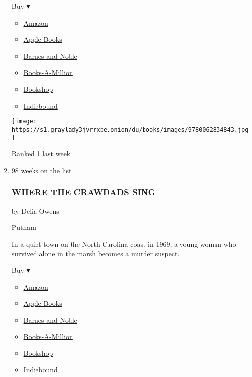 \begin{enumerate}
  Buy ▾

  \begin{itemize}
  \tightlist
  \item
    \href{https://www.amazon.com/dp/0062834843?tag=NYTBSREV-20\&tag=NYTBS-20}{Amazon}
  \item
    \href{https://du-gae-books-dot-nyt-du-prd.appspot.com/buy?title=THE+ORDER\&author=Daniel+Silva}{Apple
    Books}
  \item
    \href{https://www.anrdoezrs.net/click-7990613-11819508?url=https\%3A\%2F\%2Fwww.barnesandnoble.com\%2Fw\%2F\%3Fean\%3D9780062834843}{Barnes
    and Noble}
  \item
    \href{https://www.anrdoezrs.net/click-7990613-35140?url=https\%3A\%2F\%2Fwww.booksamillion.com\%2Fp\%2FTHE\%2BORDER\%2FDaniel\%2BSilva\%2F9780062834843}{Books-A-Million}
  \item
    \href{https://bookshop.org/a/3546/9780062834843}{Bookshop}
  \item
    \href{https://www.indiebound.org/book/9780062834843?aff=NYT}{Indiebound}
  \end{itemize}

  \texttt{[image: https://s1.graylady3jvrrxbe.onion/du/books/images/9780062834843.jpg]}

  Ranked 1 last week
\item
  98 weeks on the list

  \hypertarget{where-the-crawdads-sing}{%
  \subsubsection{WHERE THE CRAWDADS
  SING}\label{where-the-crawdads-sing}}

  by Delia Owens

  Putnam

  In a quiet town on the North Carolina coast in 1969, a young woman who
  survived alone in the marsh becomes a murder suspect.

  Buy ▾

  \begin{itemize}
  \tightlist
  \item
    \href{https://www.amazon.com/Where-Crawdads-Sing-Delia-Owens/dp/0735219095?tag=NYTBS-20}{Amazon}
  \item
    \href{https://du-gae-books-dot-nyt-du-prd.appspot.com/buy?title=WHERE+THE+CRAWDADS+SING\&author=Delia+Owens}{Apple
    Books}
  \item
    \href{https://www.anrdoezrs.net/click-7990613-11819508?url=https\%3A\%2F\%2Fwww.barnesandnoble.com\%2Fw\%2F\%3Fean\%3D9780735219090}{Barnes
    and Noble}
  \item
    \href{https://www.anrdoezrs.net/click-7990613-35140?url=https\%3A\%2F\%2Fwww.booksamillion.com\%2Fp\%2FWHERE\%2BTHE\%2BCRAWDADS\%2BSING\%2FDelia\%2BOwens\%2F9780735219090}{Books-A-Million}
  \item
    \href{https://bookshop.org/a/3546/9780735219090}{Bookshop}
  \item
    \href{https://www.indiebound.org/book/9780735219090?aff=NYT}{Indiebound}
  \end{itemize}


\end{enumerate}
